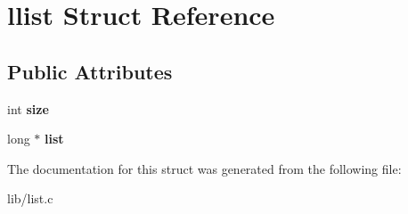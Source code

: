\hypertarget{structllist}{}\section{llist Struct Reference}
\label{structllist}
\subsection*{Public Attributes}
\begin{DoxyCompactItemize}
\item 
int {\bfseries size}\hypertarget{structllist_a10e612886a406b85ba87caefa8dd7e4e}{}\label{structllist_a10e612886a406b85ba87caefa8dd7e4e}

\item 
long $\ast$ {\bfseries list}\hypertarget{structllist_a47b4d503f0df6354f20154b58ef0d7f1}{}\label{structllist_a47b4d503f0df6354f20154b58ef0d7f1}

\end{DoxyCompactItemize}


The documentation for this struct was generated from the following file\+:\begin{DoxyCompactItemize}
\item 
lib/list.\+c\end{DoxyCompactItemize}
